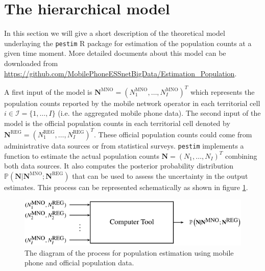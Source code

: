 \documentclass[12pt, a4paper]{article}
\begin{document}
\section{The hierarchical model}\label{model}

In this section we will give a short description of the theoretical model 
underlaying the \texttt{pestim} R package for estimation of the population 
counts at a given time moment. More detailed documents about this model can be downloaded from 
\url{https://github.com/MobilePhoneESSnetBigData/Estimation_Population}.

A first input of the model is 
$\mathbf{N}^{\textrm{MNO}}=(N_{1}^{\textrm{MNO}}, \dots, N_{I}^{\textrm{MNO}})^{T}$ which 
represents the population counts reported by the mobile network operator in 
each territorial cell $i\in\mathcal{I}=\{1,\dots,I\}$ (i.e. the aggregated mobile phone data). 
The second input of the model is the official population counts in each territorial cell denoted by 
$\mathbf{N}^{\textrm{REG}}=(N_{1}^{\textrm{REG}}, \dots, N_{I}^{\textrm{REG}})^{T}$. 
These official population counts could come from administrative data sources or from statistical surveys.
\texttt{pestim} implements a function to estimate the actual population 
counts $\mathbf{N}=(N_{1}, \dots, N_{I})^{T}$ combining both data sources. 
It also computes the posterior probability distribution 
$\mathbb{P}\left(\mathbf{N}|\mathbf{N}^{\textrm{MNO}};\mathbf{N}^{\textrm{REG}}\right)$ 
that can be used to assess the uncertainty in the output estimates.
This process can be represented schematically as shown in figure \ref{Tool}.


\begin{figure}[htbp]
\centering
\includegraphics[scale=0.75]{Tool.png}
\caption{The diagram of the process for population estimation using mobile phone and official population data.}
\label{Tool} 
\end{figure}
\end{document}
